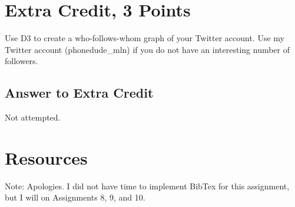 \documentclass{article}
\begin{document}
\newpage

\section*{Extra Credit, 3 Points}

Use D3 to create a who-follows-whom graph of your Twitter account. Use my Twitter account (phonedude\_mln) if you do not have an interesting number of followers.


\subsection*{Answer to Extra Credit}

Not attempted.



\newpage

\section*{Resources}

Note: Apologies. I did not have time to implement BibTex for this assignment, but I will on Assignments 8, 9, and 10.
\end{document}
